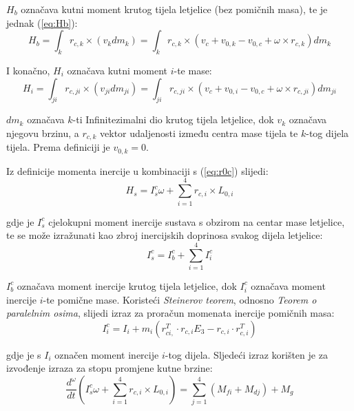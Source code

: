\documentclass[11pt,a4paper]{article}
\begin{document}
$H_{b}$ označava kutni moment krutog tijela letjelice (bez pomičnih masa), te je jednak (\ref{eq:Hb}):
\begin{equation}
H_{b} = \int_{k} r_{c,k} \times (v_{k}dm_{k}) = \int_{k} r_{c,k} \times (v_{c} + v_{0,k} - v_{0,c} + \omega \times r_{c,k})dm_{k}
\label{eq:Hb}
\end{equation}

I konačno, $H_{i}$ označava kutni moment $i$-te mase:
\begin{equation}
H_{i} = \int_{ji} r_{c,ji} \times (v_{ji}dm_{ji}) = \int_{ji} r_{c,ji} \times (v_{c} + v_{0,i} - v_{0,c} + \omega \times r_{c,ji})dm_{ji}
\label{eq:Hi}
\end{equation}

$dm_{k}$ označava $k$-ti Infinitezimalni dio krutog tijela letjelice, dok $v_{k}$ označava njegovu brzinu, a $r_{c,k}$ vektor udaljenosti između centra mase tijela te $k$-tog dijela tijela. Prema definiciji je $v_{0,k} = 0$. 

Iz definicije momenta inercije u kombinaciji s (\ref{eq:r0c}) slijedi:
\begin{equation}
H_{s} = I_{s}^{c}\omega + \sum_{i=1}^{4}r_{c,i} \times L_{0,i}
\label{eq:Hs2}
\end{equation}

gdje je $I_{s}^{c}$ cjelokupni moment inercije sustava s obzirom na centar mase letjelice, te se može izražunati kao zbroj inercijskih doprinosa svakog dijela letjelice:
\begin{equation}
I_{s}^{c} = I_{b}^{c} + \sum_{i=1}^{4}I_{i}^{c}
\label{eq:Ics}
\end{equation}

$I_{b}^{c}$ označava moment inercije krutog tijela letjelice, dok $I_{i}^{c}$ označava moment inercije $i$-te pomične mase. Koristeći \textit{Steinerov teorem}, odnosno \textit{Teorem o paralelnim osima}, slijedi izraz za proračun momenata inercije pomičnih masa:
\begin{equation}
I_{i}^{c} = I_{i} + m_{i} \left(  r_{ci,}^{T} \cdot r_{c,i}E_{3} - r_{c,i}\cdot r_{c,i}^{T} \right)
\label{eq:Iic}
\end{equation}

gdje je s $I_{i}$ označen moment inercije $i$-tog dijela. Sljedeći izraz korišten je za izvođenje izraza za stopu promjene kutne brzine:
\begin{equation}
\frac{d^{\omega}}{dt} \left( I_{s}^{c} \omega + \sum_{i=1}^{4} r_{c,i}\times L_{0,i}  \right) = \sum_{j=1}^{4}(M_{fi} + M_{dj}) + M_{g}
\label{eq:dtM}
\end{equation}
\end{document}
